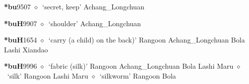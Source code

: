   \begin{list}{}{\leftmargin=1.5em \itemindent=-1.5em}
  \item {\footnotesize \textbf{*bu}}{\tiny 9507}
         $\diamond$~`secret, keep'
         Achang\_Longchuan 
  \item {\footnotesize \textbf{*buH}}{\tiny 9907}
\hspace{1ex}
         $\diamond$~`shoulder'
         Achang\_Longchuan 
  \item {\footnotesize \textbf{*buH}}{\tiny 1654}
\hspace{1ex}
         $\diamond$~`carry (a child) on the back)'
         Rangoon 
\hspace{1ex}
         Achang\_Longchuan 
\hspace{1ex}
         Bola 
\hspace{1ex}
         Lashi 
\hspace{1ex}
         Xiandao 
  \item {\footnotesize \textbf{*buH}}{\tiny 9996}
\hspace{1ex}
         $\diamond$~`fabric (silk)'
         Rangoon 
\hspace{1ex}
         Achang\_Longchuan 
\hspace{1ex}
         Bola 
\hspace{1ex}
         Lashi 
\hspace{1ex}
         Maru 
\hspace{1ex}
         $\diamond$~`silk'
         Rangoon 
\hspace{1ex}
         Lashi 
\hspace{1ex}
         Maru 
\hspace{1ex}
         $\diamond$~`silkworm'
         Rangoon 
\hspace{1ex}
         Bola 

\end{list}

